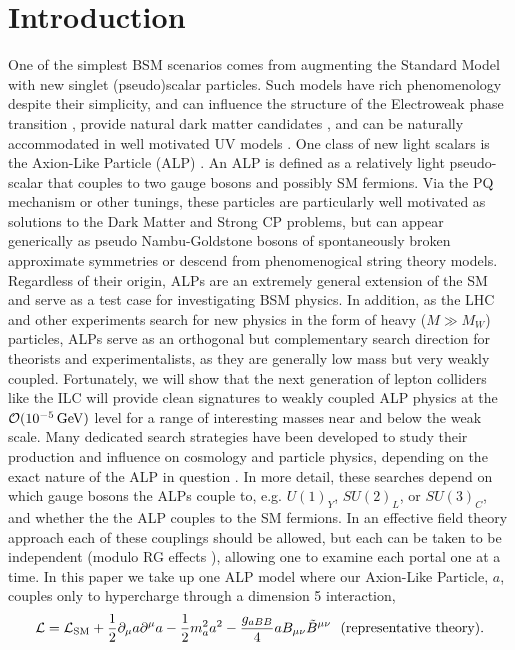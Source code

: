 \documentclass[aps,onecolumn,twoside,secnumarabic,12pt,balancelastpage,amsmath,amssymb,nofootinbib,hyperref=pdftex]{revtex4}
\begin{document}
\section {Introduction}
One of the simplest BSM scenarios comes from augmenting the Standard Model with new singlet (pseudo)scalar particles. Such models have rich phenomenology despite their simplicity, and can influence the structure of the Electroweak phase transition \cite{Carena:2019une}, provide natural dark matter candidates \cite{Duffy:2009ig,Athron:2017kgt}, and can be naturally accommodated in well motivated UV models \cite{Svrcek:2006yi}. One class of new light scalars is the Axion-Like Particle (ALP) \cite{Ringwald:2014vqa,Beacham:2019nyx}. An ALP is defined as a relatively light pseudo-scalar that couples to two gauge bosons and possibly SM fermions. Via the PQ mechanism \cite{PhysRevLett.40.223} or other tunings, these particles are particularly well motivated as solutions to the Dark Matter and Strong CP problems, but can appear generically as pseudo Nambu-Goldstone bosons of spontaneously broken approximate symmetries or descend from phenomenogical string theory models. Regardless of their origin, ALPs are an extremely general extension of the SM and serve as a test case for investigating BSM physics. In addition, as the LHC and other experiments search for new physics in the form of heavy ($ M \gg M_{W}$) particles, ALPs serve as an orthogonal but complementary search direction for theorists and experimentalists, as they are generally low mass but very weakly coupled. Fortunately, we will show that the next generation of lepton colliders like the ILC will provide clean signatures to weakly coupled ALP physics at the $\mathcal{O}(10^{-5}\,\rm{GeV})$ level for a range of interesting masses near and below the weak scale.
\vskip 0.12in
Many dedicated search strategies have been developed to study their production and influence on cosmology and particle physics, depending on the exact nature of the ALP in question \cite{Kim:1986ax}. In more detail, these searches depend on which gauge bosons the ALPs couple to, e.g. $U(1)_{Y}$, $SU(2)_{L}$, or $SU(3)_{C}$, and whether the the ALP couples to the SM fermions. In an effective field theory approach each of these couplings should be allowed, but each can be taken to be independent (modulo RG effects \cite{Bauer:2020jbp,Chala:2020wvs}), allowing one to examine each portal one at a time. In this paper we take up one ALP model where our Axion-Like Particle, $a$, couples only to hypercharge through a dimension 5 interaction,
\begin{equation}
{\cal L} = {\cal L}_{\rm SM}+\frac{1}{2}\partial_\mu a\partial^\mu a -\frac{1}{2}m^2_{a}a^2 - \frac{g_{a BB}}{4}a B_{\mu\nu}\tilde{B}^{\mu\nu}~~{\rm (representative~theory).}
\label{eq:theory}
\end{equation}
\end{document}
